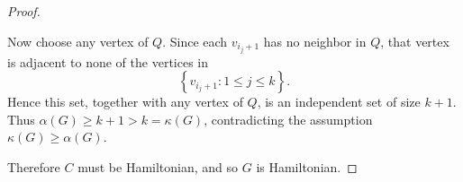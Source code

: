 \begin{proof}
\begin{explanation}
\begin{center}
         \end{center}
    \end{explanation}

    Now choose any vertex of \(Q\). Since each \(v_{i_j+1}\) has no neighbor in \(Q\), that vertex is adjacent to none of the vertices in
    \[
        \left\{ v_{i_j + 1}: 1 \le j \le k \right\}.
    \]
    Hence this set, together with any vertex of \(Q\), is an independent set of size \(k + 1\). Thus \(\alpha (G) \ge k + 1 > k = \kappa (G)\), contradicting the assumption \(\kappa (G) \ge \alpha (G)\).

    Therefore \(C\) must be Hamiltonian, and so \(G\) is Hamiltonian.
\end{proof}